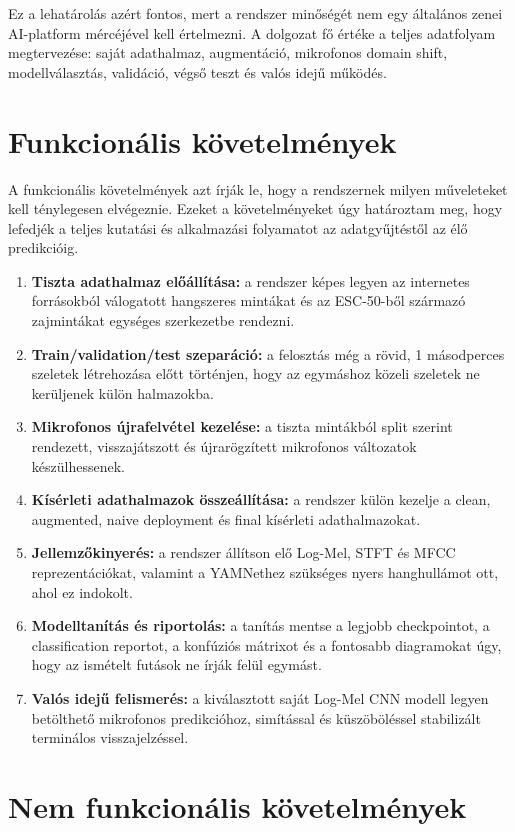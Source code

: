 Ez a lehatárolás azért fontos, mert a rendszer minőségét nem egy általános zenei AI-platform mércéjével kell értelmezni. A dolgozat fő értéke a teljes adatfolyam megtervezése: saját adathalmaz, augmentáció, mikrofonos domain shift, modellválasztás, validáció, végső teszt és valós idejű működés.

\section{Funkcionális követelmények}

A funkcionális követelmények azt írják le, hogy a rendszernek milyen műveleteket kell ténylegesen elvégeznie. Ezeket a követelményeket úgy határoztam meg, hogy lefedjék a teljes kutatási és alkalmazási folyamatot az adatgyűjtéstől az élő predikcióig.

\begin{enumerate}
  \item \textbf{Tiszta adathalmaz előállítása:} a rendszer képes legyen az internetes forrásokból válogatott hangszeres mintákat és az ESC-50-ből származó zajmintákat egységes szerkezetbe rendezni.
  \item \textbf{Train/validation/test szeparáció:} a felosztás még a rövid, 1 másodperces szeletek létrehozása előtt történjen, hogy az egymáshoz közeli szeletek ne kerüljenek külön halmazokba.
  \item \textbf{Mikrofonos újrafelvétel kezelése:} a tiszta mintákból split szerint rendezett, visszajátszott és újrarögzített mikrofonos változatok készülhessenek.
  \item \textbf{Kísérleti adathalmazok összeállítása:} a rendszer külön kezelje a clean, augmented, naive deployment és final kísérleti adathalmazokat.
  \item \textbf{Jellemzőkinyerés:} a rendszer állítson elő Log-Mel, STFT és MFCC reprezentációkat, valamint a YAMNethez szükséges nyers hanghullámot ott, ahol ez indokolt.
  \item \textbf{Modelltanítás és riportolás:} a tanítás mentse a legjobb checkpointot, a classification reportot, a konfúziós mátrixot és a fontosabb diagramokat úgy, hogy az ismételt futások ne írják felül egymást.
  \item \textbf{Valós idejű felismerés:} a kiválasztott saját Log-Mel CNN modell legyen betölthető mikrofonos predikcióhoz, simítással és küszöböléssel stabilizált terminálos visszajelzéssel.
\end{enumerate}

\section{Nem funkcionális követelmények}


